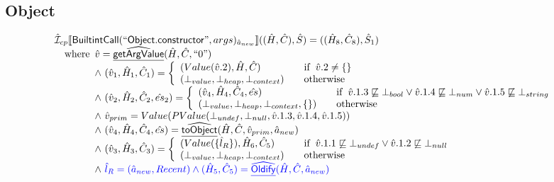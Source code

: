 \subsection{Object}
\[
\begin{array}{l}

\aI _{cp}\lbr \SF{BuiltintCall}(``\SF{Object.constructor}",args)_{\hat{a}_{new}}\rbr((\hat{H},\hat{C}), \hat{S})
  = ((\hat{H}_8, \hat{C}_8), \hat{S}_1)\\
\quad\wherec{
  \hat{v} = \ahf{getArgValue}(\hat{H}, \hat{C}, ``0")\\
  \land\ (\hat{v}_1, \hat{H}_1, \hat{C}_1 )=
    \left\{\begin{array}{l@{\quad\quad}l}
      (Value(\hat{v}.2), \hat{H}, \hat{C}) & \ifc{\hat{v}.2 \neq \{ \} }\\
      (\bot_{value}, \bot_{heap}, \bot_{context}) & \owc \\
    \end{array}\right.\\
  \land\ (\hat{v}_2, \hat{H}_2, \hat{C}_2, \hat{es}_2 )=
    \left\{\begin{array}{l@{\quad\quad}l}
      (\hat{v}_4, \hat{H}_4, \hat{C}_4, \hat{es})
      & \ifc{\hat{v}.1.3 \not\sqsubseteq \bot_{bool}
         \lor \hat{v}.1.4 \not\sqsubseteq \bot_{num} \lor \hat{v}.1.5 \not\sqsubseteq \bot_{string}}\\
      (\bot_{value}, \bot_{heap}, \bot_{context},\{ \}) & \owc \\
    \end{array}\right.\\
  \land\ \hat{v}_{prim} = Value(PValue(\bot_{undef}, \bot_{null}, \hat{v}.1.3, \hat{v}.1.4, \hat{v}.1.5))\\
  \land\ (\hat{v}_4, \hat{H}_4, \hat{C}_4, \hat{es} ) = \ahf{toObject}(\hat{H}, \hat{C}, \hat{v}_{prim}, \hat{a}_{new})\\
  \land\ (\hat{v}_3, \hat{H}_3, \hat{C}_3 )=
    \left\{\begin{array}{l@{\quad\quad}l}
      (Value(\{\hat{l}_{R}\}), \hat{H}_6, \hat{C}_5)
      & \ifc{\hat{v}.1.1 \not\sqsubseteq \bot_{undef} \lor \hat{v}.1.2 \not\sqsubseteq \bot_{null}}\\
      (\bot_{value}, \bot_{heap}, \bot_{context}) & \owc \\
    \end{array}\right.\\
  \land\ \inblue\hat{l}_{R} = (\hat{a}_{new}, Recent)
  \land \inblue (\hat{H}_5, \hat{C}_5) = \ahf{Oldify}(\hat{H}, \hat{C}, \hat{a}_{new})
}
\end{array}\]
